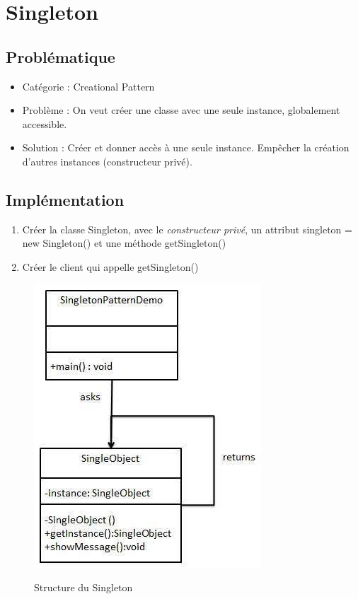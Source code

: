\newpage
\section{Singleton}
\subsection{Problématique}
\begin{itemize}
    \item Catégorie : Creational Pattern
    \item Problème : On veut créer une classe avec une seule instance, globalement accessible.
    \item Solution : Créer et donner accès à une seule instance. Empêcher la création d'autres instances (constructeur privé).
\end{itemize}
\subsection{Implémentation}
\begin{enumerate}
    \item Créer la classe Singleton, avec le \textit{constructeur privé}, un attribut singleton = new Singleton() et une méthode getSingleton()
    \item Créer le client qui appelle getSingleton()

\end{enumerate}

\begin{figure}[!ht]
	\centering
	\begin{minipage}[t]{8.0cm}
		\includegraphics[scale=0.45]{Images/sing.jpg}
		\label{s1}
   		\caption{Structure du Singleton}
	\end{minipage}
	
\end{figure}


